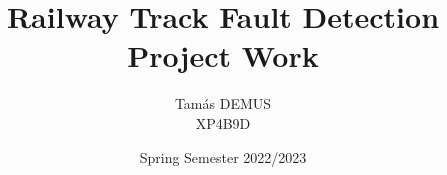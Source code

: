 \documentclass{article}
\title{Railway Track Fault Detection\\\large Project Work\\}
\author{Tamás DEMUS\\XP4B9D}
\date{Spring Semester 2022/2023}
\begin{document}


\pagebreak

\pagebreak
\tableofcontents
\pagebreak










\pagebreak
\listoffigures
\pagebreak
\listoftables
\pagebreak
\printbibliography
\end{document}
